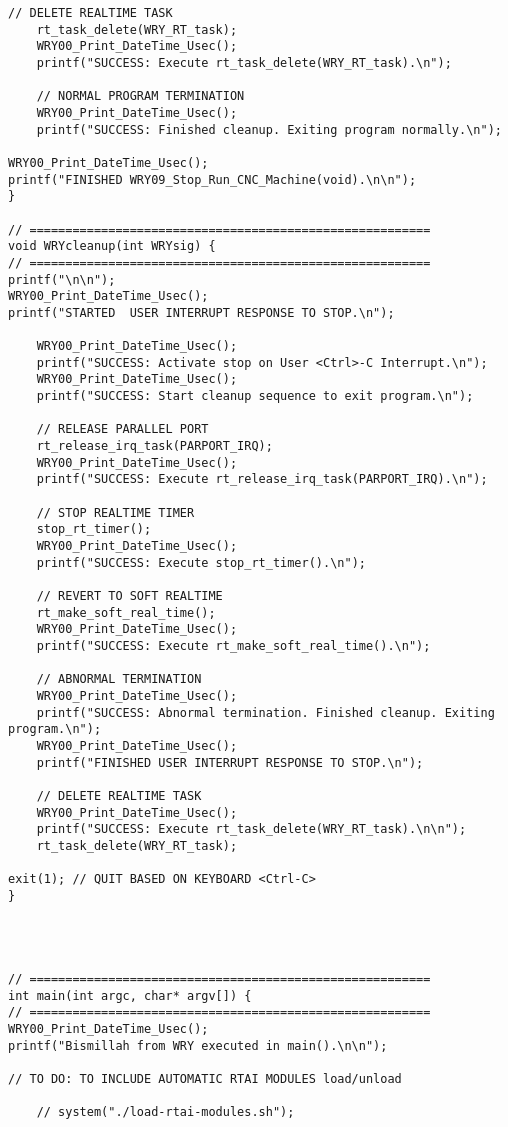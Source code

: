 \begin{lstlisting}[caption={App4-Full C-Code listing for Real Time (RTAI)}, label=App4-Full C-Code listing for Real Time (RTAI)]
	// DELETE REALTIME TASK
	rt_task_delete(WRY_RT_task);
	WRY00_Print_DateTime_Usec(); 
	printf("SUCCESS: Execute rt_task_delete(WRY_RT_task).\n");
	
	// NORMAL PROGRAM TERMINATION
	WRY00_Print_DateTime_Usec(); 
	printf("SUCCESS: Finished cleanup. Exiting program normally.\n");

WRY00_Print_DateTime_Usec(); 
printf("FINISHED WRY09_Stop_Run_CNC_Machine(void).\n\n");
}

// ========================================================
void WRYcleanup(int WRYsig) {
// ========================================================
printf("\n\n");
WRY00_Print_DateTime_Usec(); 
printf("STARTED  USER INTERRUPT RESPONSE TO STOP.\n");

	WRY00_Print_DateTime_Usec(); 
	printf("SUCCESS: Activate stop on User <Ctrl>-C Interrupt.\n");
	WRY00_Print_DateTime_Usec(); 
	printf("SUCCESS: Start cleanup sequence to exit program.\n");
	
	// RELEASE PARALLEL PORT 
	rt_release_irq_task(PARPORT_IRQ);
	WRY00_Print_DateTime_Usec(); 
	printf("SUCCESS: Execute rt_release_irq_task(PARPORT_IRQ).\n");
	
	// STOP REALTIME TIMER
	stop_rt_timer();
	WRY00_Print_DateTime_Usec(); 
	printf("SUCCESS: Execute stop_rt_timer().\n");
	
	// REVERT TO SOFT REALTIME
	rt_make_soft_real_time();
	WRY00_Print_DateTime_Usec(); 
	printf("SUCCESS: Execute rt_make_soft_real_time().\n");
	
	// ABNORMAL TERMINATION
	WRY00_Print_DateTime_Usec(); 
	printf("SUCCESS: Abnormal termination. Finished cleanup. Exiting program.\n");
	WRY00_Print_DateTime_Usec(); 
	printf("FINISHED USER INTERRUPT RESPONSE TO STOP.\n");
	
	// DELETE REALTIME TASK
	WRY00_Print_DateTime_Usec(); 
	printf("SUCCESS: Execute rt_task_delete(WRY_RT_task).\n\n");
	rt_task_delete(WRY_RT_task);

exit(1); // QUIT BASED ON KEYBOARD <Ctrl-C>
}




// ======================================================== 
int main(int argc, char* argv[]) {
// ========================================================
WRY00_Print_DateTime_Usec(); 
printf("Bismillah from WRY executed in main().\n\n");

// TO DO: TO INCLUDE AUTOMATIC RTAI MODULES load/unload

	// system("./load-rtai-modules.sh");
	

\end{lstlisting}
